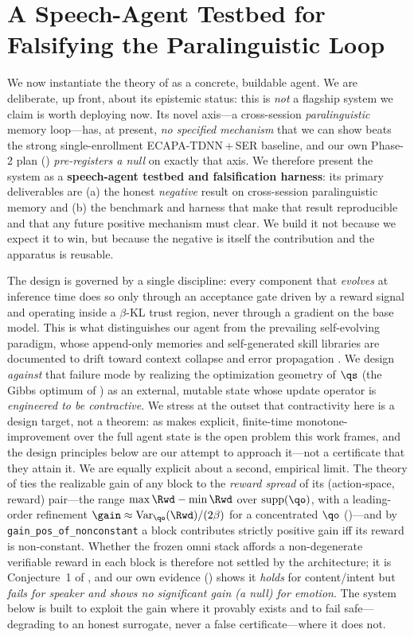 \section{A Speech-Agent Testbed for Falsifying the Paralinguistic Loop}
\label{sec:system}

We now instantiate the theory of  as a concrete, buildable agent. We are deliberate, up front, about its epistemic status: this is \emph{not} a flagship system we claim is worth deploying now. Its novel axis---a cross-session \emph{paralinguistic} memory loop---has, at present, \emph{no specified mechanism} that we can show beats the strong single-enrollment ECAPA-TDNN\,+\,SER baseline, and our own Phase-2 plan () \emph{pre-registers a null} on exactly that axis. We therefore present the system as a \textbf{speech-agent testbed and falsification harness}: its primary deliverables are (a) the honest \emph{negative} result on cross-session paralinguistic memory and (b) the benchmark and harness that make that result reproducible and that any future positive mechanism must clear. We build it not because we expect it to win, but because the negative is itself the contribution and the apparatus is reusable.

The design is governed by a single discipline: every component that \emph{evolves} at inference time does so only through an acceptance gate driven by a reward signal and operating inside a $\beta$-KL trust region, never through a gradient on the base model. This is what distinguishes our agent from the prevailing self-evolving paradigm, whose append-only memories and self-generated skill libraries are documented to drift toward context collapse and error propagation \citep{ace2025,expfollowing2025,remembering2026}. We design \emph{against} that failure mode by realizing the optimization geometry of $\qs$ (the Gibbs optimum of ) as an external, mutable state whose update operator is \emph{engineered to be contractive}. We stress at the outset that contractivity here is a design target, not a theorem: as  makes explicit, finite-time monotone-improvement over the full agent state is the open problem this work frames, and the design principles below are our attempt to approach it---not a certificate that they attain it. We are equally explicit about a second, empirical limit. The theory of  ties the realizable gain of any block to the \emph{reward spread} of its (action-space, reward) pair---the range $\max\Rwd-\min\Rwd$ over $\mathrm{supp}(\qo)$, with a leading-order refinement $\gain\approx\operatorname{Var}_{\qo}(\Rwd)/(2\beta)$ for a concentrated $\qo$ ()---and by \texttt{gain\_pos\_of\_nonconstant} a block contributes strictly positive gain iff its reward is non-constant. Whether the frozen omni stack affords a non-degenerate verifiable reward in each block is therefore not settled by the architecture; it is Conjecture~1 of , and our own evidence () shows it \emph{holds} for content/intent but \emph{fails for speaker and shows no significant gain (a null) for emotion}. The system below is built to exploit the gain where it provably exists and to fail safe---degrading to an honest surrogate, never a false certificate---where it does not.

